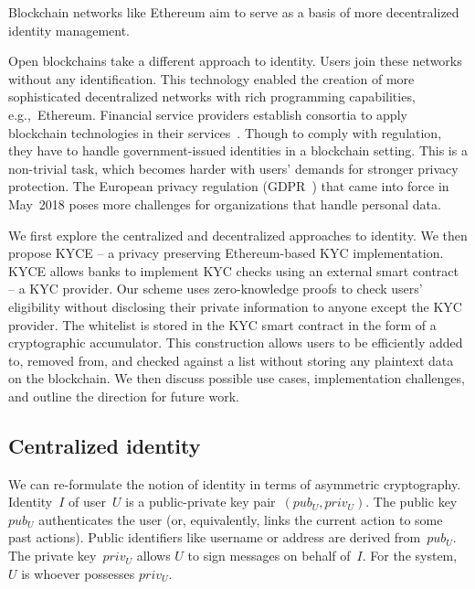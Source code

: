 Blockchain networks like Ethereum aim to serve as a basis of more decentralized identity management.

Open blockchains take a different approach to identity.
Users join these networks without any identification.
This technology enabled the creation of more sophisticated decentralized networks with rich programming capabilities, e.g.,~Ethereum.
Financial service providers establish consortia to apply blockchain technologies in their services~\cite{EEA2017, Hyperledger, R3}.
Though to comply with regulation, they have to handle government-issued identities in a blockchain setting.
This is a non-trivial task, which becomes harder with users' demands for stronger privacy protection.
The European privacy regulation (GDPR~\cite{GDPR16}) that came into force in May~2018 poses more challenges for organizations that handle personal data.

We first explore the centralized and decentralized approaches to identity.
We then propose KYCE -- a privacy preserving Ethereum-based KYC implementation.
KYCE allows banks to implement KYC checks using an external smart contract -- a KYC provider.
Our scheme uses zero-knowledge proofs to check users' eligibility without disclosing their private information to anyone except the KYC provider.
The whitelist is stored in the KYC smart contract in the form of a cryptographic accumulator.
This construction allows users to be efficiently added to, removed from, and checked against a list without storing any plaintext data on the blockchain.
We then discuss possible use cases, implementation challenges, and outline the direction for future work.

\subsection{Centralized identity}

We can re-formulate the notion of identity in terms of asymmetric cryptography.
Identity~$I$ of user~$U$ is a public-private key pair~$(pub_U, priv_U)$.
The public key~$pub_U$ authenticates the user (or, equivalently, links the current action to some past actions).
Public identifiers like username or address are derived from~$pub_U$.
The private key~$priv_U$ allows $U$ to sign messages on behalf of~$I$.
For the system, $U$ is whoever possesses $priv_U$.

